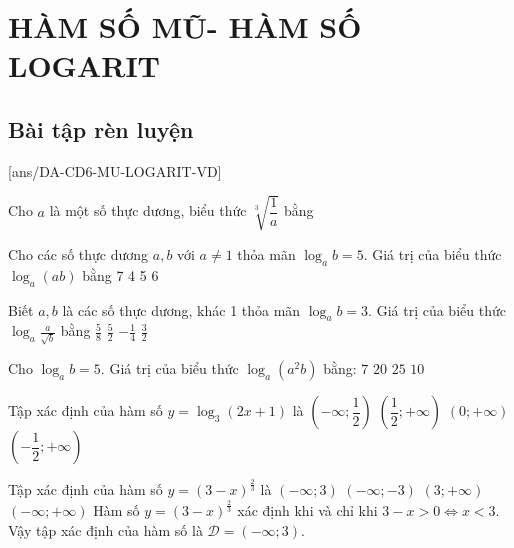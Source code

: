 \setcounter{ex}{0}
\section{HÀM SỐ MŨ- HÀM SỐ LOGARIT}
\subsection{Bài tập rèn luyện}
[ans/DA-CD6-MU-LOGARIT-VD]
\begin{ex}%
Cho $a$ là một số thực dương, biểu thức $\sqrt[3]{\dfrac{1}{a}}$ bằng
\end{ex}
\begin{ex} Cho các số thực dương $a, b$ với $a \neq 1$ thỏa mãn $\log_a b = 5$. Giá trị của biểu thức $\log_a (ab)$ bằng
\choice
{7}
{4}
{5}
{\True $6$}
\loigiai{
    
}
\end{ex}
\begin{ex}
Biết $a, b$ là các số thực dương, khác 1 thỏa mãn $\log_a b = 3$. Giá trị của biểu thức $\log_a \frac{a}{\sqrt{b}}$ bằng
\choice
{$\frac{5}{8}$}
{$\frac{5}{2}$}
{\True $-\frac{1}{4}$}
{$\frac{3}{2}$}
\loigiai{
    
}
\end{ex}
\begin{ex} %
Cho $\log_a b = 5$. Giá trị của biểu thức $\log_a\left(a^2 b\right)$ bằng:
\choice
{\True $7$}
{$20$}
{$25$}
{$10$}
\end{ex}
\begin{ex}%
Tập xác định của hàm số $y=\log_3 \left(2x+1\right)$ là
\choice
{$\left(-\infty;\dfrac{1}{2}\right)$}
{ $\left(\dfrac{1}{2};+\infty\right)$}
{$\left(0;+\infty\right)$}
{\True $\left(-\dfrac{1}{2};+\infty\right)$}
\end{ex}
\begin{ex}%
Tập xác định của hàm số $y=\left(3-x\right)^\frac{2}{3}$ là 
\choice
{\True $\left(-\infty;3\right)$}
{$\left(-\infty;-3\right)$}
{$\left(3;+\infty\right)$}
{$\left(-\infty;+\infty\right)$}
\loigiai
{
    Hàm số $y=\left(3-x\right)^\frac{2}{3}$ xác định khi và chỉ khi $3-x>0 \Leftrightarrow x<3$.\\
    Vậy tập xác định của hàm số là $\mathscr{D} = \left(-\infty;3\right)$.
}
\end{ex}

